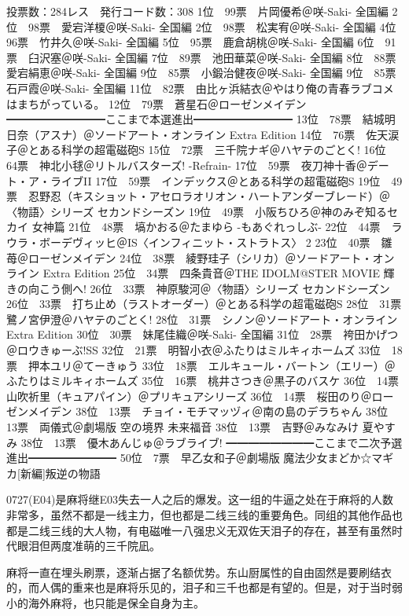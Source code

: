	投票数：284レス　発行コード数：308
	1位　99票　片岡優希＠咲-Saki- 全国編
	2位　98票　愛宕洋榎＠咲-Saki- 全国編
	2位　98票　松実宥＠咲-Saki- 全国編
	4位　96票　竹井久＠咲-Saki- 全国編
	5位　95票　鹿倉胡桃＠咲-Saki- 全国編
	6位　91票　臼沢塞＠咲-Saki- 全国編
	7位　89票　池田華菜＠咲-Saki- 全国編
	8位　88票　愛宕絹恵＠咲-Saki- 全国編
	9位　85票　小鍛治健夜＠咲-Saki- 全国編
	9位　85票　石戸霞＠咲-Saki- 全国編
	11位　82票　由比ヶ浜結衣＠やはり俺の青春ラブコメはまちがっている。
	12位　79票　蒼星石＠ローゼンメイデン
	━━━━━━━━━ここまで本選進出━━━━━━━━━
	13位　78票　結城明日奈（アスナ）＠ソードアート・オンライン Extra Edition
	14位　76票　佐天涙子＠とある科学の超電磁砲S
	15位　72票　三千院ナギ＠ハヤテのごとく!
	16位　64票　神北小毬＠リトルバスターズ! -Refrain-
	17位　59票　夜刀神十香＠デート・ア・ライブII
	17位　59票　インデックス＠とある科学の超電磁砲S
	19位　49票　忍野忍（キスショット・アセロラオリオン・ハートアンダーブレード）＠〈物語〉シリーズ セカンドシーズン
	19位　49票　小阪ちひろ＠神のみぞ知るセカイ 女神篇
	21位　48票　塙かおる＠たまゆら -もあぐれっしぶ-
	22位　44票　ラウラ・ボーデヴィッヒ＠IS〈インフィニット・ストラトス〉 2
	23位　40票　雛苺＠ローゼンメイデン
	24位　38票　綾野珪子（シリカ）＠ソードアート・オンライン Extra Edition
	25位　34票　四条貴音＠THE IDOLM@STER MOVIE 輝きの向こう側へ!
	26位　33票　神原駿河＠〈物語〉シリーズ セカンドシーズン
	26位　33票　打ち止め（ラストオーダー）＠とある科学の超電磁砲S
	28位　31票　鷺ノ宮伊澄＠ハヤテのごとく!
	28位　31票　シノン＠ソードアート・オンライン Extra Edition
	30位　30票　妹尾佳織＠咲-Saki- 全国編
	31位　28票　袴田かげつ＠ロウきゅーぶ!SS
	32位　21票　明智小衣＠ふたりはミルキィホームズ
	33位　18票　押本ユリ＠てーきゅう
	33位　18票　エルキュール・バートン（エリー）＠ふたりはミルキィホームズ
	35位　16票　桃井さつき＠黒子のバスケ
	36位　14票　山吹祈里（キュアパイン）＠プリキュアシリーズ
	36位　14票　桜田のり＠ローゼンメイデン
	38位　13票　チョイ・モチマッヅィ＠南の島のデラちゃん
	38位　13票　両儀式＠劇場版 空の境界 未来福音
	38位　13票　吉野＠みなみけ 夏やすみ
	38位　13票　優木あんじゅ＠ラブライブ!
	━━━━━━━━ここまで二次予選進出━━━━━━━━
	50位　7票　早乙女和子＠劇場版 魔法少女まどか☆マギカ[新編]叛逆の物語

0727(E04)是麻将继E03失去一人之后的爆发。这一组的牛逼之处在于麻将的人数非常多，虽然不都是一线主力，但也都是二线三线的重要角色。同组的其他作品也都是二线三线的大人物，有电磁唯一八强忠义无双佐天泪子的存在，甚至有虽然时代眼泪但两度准萌的三千院凪。

麻将一直在埋头刷票，逐渐占据了名额优势。东山厨属性的自由固然是要刷结衣的，而人偶的重来也是麻将乐见的，泪子和三千也都是有望的。但是，对于当时弱小的海外麻将，也只能是保全自身为主。

